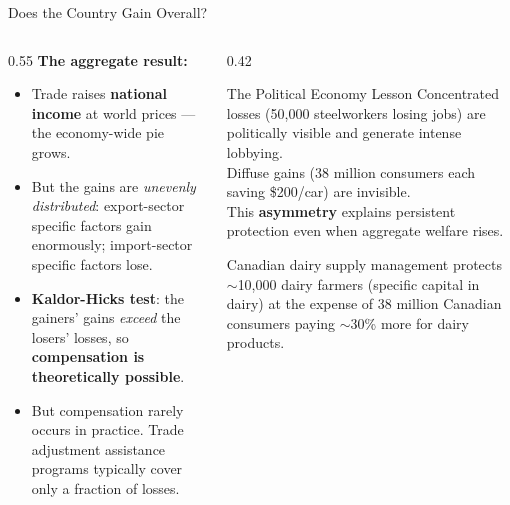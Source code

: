 \documentclass[aspectratio=169]{beamer}
\begin{document}
\begin{frame}[shrink=5]{Does the Country Gain Overall?}
\begin{columns}[T]
\begin{column}{0.55\textwidth}
\textbf{The aggregate result:}
\begin{itemize}\small
  \item Trade raises \textbf{national income} at world
        prices --- the economy-wide pie grows.
  \item But the gains are \emph{unevenly distributed}:
        export-sector specific factors gain enormously;
        import-sector specific factors lose.
  \item \textbf{Kaldor-Hicks test}: the gainers' gains
        \emph{exceed} the losers' losses, so
        \textbf{compensation is theoretically possible}.
  \item But compensation rarely occurs in practice.
        Trade adjustment assistance programs typically
        cover only a fraction of losses.
\end{itemize}
\end{column}
\begin{column}{0.42\textwidth}
\begin{insight}{The Political Economy Lesson}
\footnotesize Concentrated losses (50,000 steelworkers
losing jobs) are politically visible and generate
intense lobbying.\\[0.2em]
Diffuse gains (38 million consumers each saving
\$200/car) are invisible.\\[0.2em]
This \textbf{asymmetry} explains persistent
protection even when aggregate welfare rises.
\end{insight}
\vspace{0.3em}
\begin{canadex}
\footnotesize Canadian dairy supply management protects
$\sim$10,000 dairy farmers (specific capital in dairy)
at the expense of 38 million Canadian consumers
paying $\sim$30\% more for dairy products.
\end{canadex}
\end{column}
\end{columns}
\end{frame}

\end{document}
